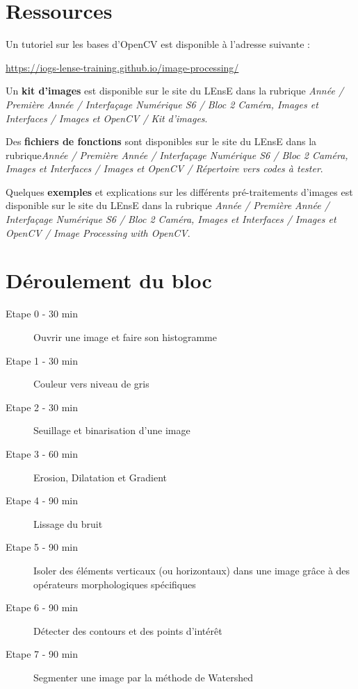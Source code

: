 \documentclass[a4paper,11pt,titlepage]{article} %
\begin{document}
\medskip


\section{Ressources}

Un tutoriel sur les bases d'OpenCV est disponible à l’adresse suivante : 

\href{https://iogs-lense-training.github.io/image-processing/}{https://iogs-lense-training.github.io/image-processing/}

Un \textbf{kit d'images} est disponible sur le site du LEnsE dans la rubrique \textit{Année / Première Année / Interfaçage Numérique S6 / Bloc 2 Caméra, Images et Interfaces / Images et OpenCV / Kit d'images}. 

Des \textbf{fichiers de fonctions} sont disponibles sur le site du LEnsE dans la rubrique\textit{Année / Première Année / Interfaçage Numérique S6 / Bloc 2 Caméra, Images et Interfaces / Images et OpenCV / Répertoire vers codes à tester}. 


Quelques \textbf{exemples} et explications sur les différents pré-traitements d'images est disponible sur le site du LEnsE dans la rubrique \textit{Année / Première Année / Interfaçage Numérique S6 / Bloc 2 Caméra, Images et Interfaces / Images et OpenCV / Image Processing with OpenCV}. 


\section{Déroulement du bloc}

\begin{description}
	\item[Etape 0 - 30 min] Ouvrir une image et faire son histogramme
	\item[Etape 1 - 30 min] Couleur vers niveau de gris
	\item[Etape 2 - 30 min] Seuillage et binarisation d'une image
	\item[Etape 3 - 60 min] Erosion, Dilatation et Gradient
	\item[Etape 4 - 90 min] Lissage du bruit
	\item[Etape 5 - 90 min] Isoler des éléments verticaux (ou horizontaux) dans une image grâce à des opérateurs morphologiques spécifiques
	\item[Etape 6 - 90 min] Détecter des contours et des points d'intérêt
	\item[Etape 7 - 90 min] Segmenter une image par la méthode de Watershed
	
\end{description}
	
\end{document}
